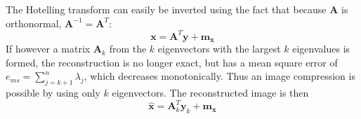 The Hotelling transform can easily be inverted using the fact that because $\mathbf{A}$ is orthonormal, $\mathbf{A}^{-1} = \mathbf{A}^T$:
	\[
		\mathbf{x} = \mathbf{A}^T \mathbf{y} + \mathbf{m_x}
	\]
If however a matrix $\mathbf{A}_k$ from the $k$ eigenvectors with the largest $k$ eigenvalues is formed, the reconstruction is no longer exact, but has a mean square error of $e_{ms} = \sum\limits_{j=k+1}^{n} \lambda_j$, which decreases monotonically.
Thus an image compression is possible by using only $k$ eigenvectors. The reconstructed image is then
	\[
		\hat{\mathbf{x}} = \mathbf{A}_k^T \mathbf{y}_k + \mathbf{m_x}
	\]

%
%
%
